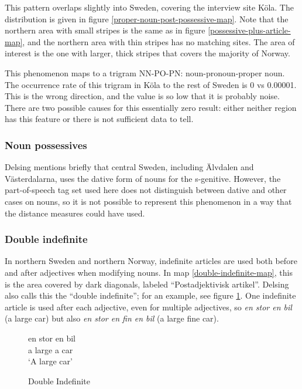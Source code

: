 This pattern overlaps slightly into Sweden, covering the interview
site K\"ola. The distribution is given in figure
\ref{proper-noun-post-possessive-map}. Note that the northern area
with small stripes is the same as in figure
\ref{possessive-plus-article-map}, and the northern area with thin
stripes has no matching sites. The area of interest is the one with
larger, thick stripes that covers the majority of Norway.

This phenomenon maps to a trigram NN-PO-PN: noun-pronoun-proper
noun. The occurrence rate of this trigram in K\"ola to the rest of
Sweden is 0 vs 0.00001. This is the wrong direction, and the value is
so low that it is probably noise. There are two possible causes for
this essentially zero result: either neither region has this feature
or there is not sufficient data to tell.

\subsubsection{Noun possessives}

Delsing mentions briefly that central Sweden, including \"Alvdalen and
V\"asterdalarna, uses the dative form of nouns for the
s-genitive. However, the part-of-speech tag set used here does not
distinguish between dative and other cases on nouns, so it is not
possible to represent this phenomenon in a way that the distance
measures could have used.

\subsubsection{Double indefinite}

In northern Sweden and northern Norway, indefinite articles are used
both before and after adjectives when modifying nouns. In map
\ref{double-indefinite-map}, this is the area covered by dark
diagonals, labeled ``Postadjektivisk artikel''. Delsing also calls
this the ``double indefinite''; for an example, see figure
\ref{double-indefinite-example}. One indefinite article is used after
each adjective, even for multiple adjectives, so {\it en stor en bil}
(a large car) but also {\it en stor en fin en bil} (a large fine car).

\begin{figure}
 \gll en stor en bil \\
  a large a car \\
  \trans `A large car'
  \caption{Double Indefinite}
  \label{double-indefinite-example}
\end{figure}

